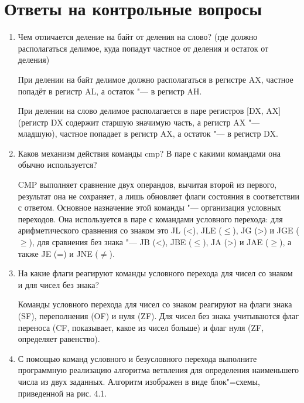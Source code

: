 \documentclass[bachelor, och, otchet]{../SCWorks}
\begin{document}
\section{Ответы на контрольные вопросы}
\begin{enumerate}
\item Чем отличается деление на байт от деления на слово? (где должно располагаться делимое, куда попадут частное от деления и остаток от деления)

При делении на байт делимое должно располагаться в регистре AX, частное попадёт в регистр AL, а остаток "--- в регистр AH.

При делении на слово делимое располагается в паре регистров [DX, AX] (регистр DX содержит старшую значимую часть, а регистр AX "--- младшую), частное попадает в регистр AX, а остаток "--- в регистр DX.
\item Каков механизм действия команды cmp? В паре с какими командами она обычно используется?

CMP выполняет сравнение двух операндов, вычитая второй из первого, результат она не сохраняет, а лишь обновляет флаги состояния в соответствии с ответом. Основное назначение этой команды "--- организация условных переходов. Она используется в паре с командами условного перехода: для арифметического сравнения со знаком это JL (<), JLE ($\leq$), JG (>) и JGE ($\geq$), для сравнения без знака "--- JB (<), JBE ($\leq$), JA (>) и JAE ($\geq$), а также JE (=) и JNE ($\ne$).

\item На какие флаги реагируют команды условного перехода для чисел со знаком и для чисел без знака?

Команды условного перехода для чисел со знаком реагируют на флаги знака (SF), переполнения (OF) и нуля (ZF). Для чисел без знака учитываются флаг переноса (CF, показывает, какое из чисел больше) и флаг нуля (ZF, определяет равенство).

\item С помощью команд условного и безусловного перехода выполните программную реализацию алгоритма ветвления для определения наименьшего числа из двух заданных. Алгоритм изображен в виде блок"=схемы, приведенной на рис. 4.1.


\end{enumerate}
\end{document}
